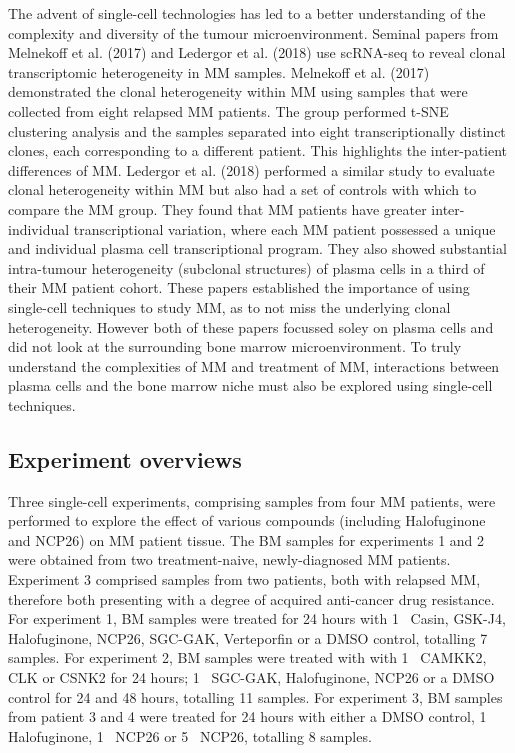 The advent of single-cell technologies has led to a better understanding of the complexity and diversity of the tumour microenvironment.
Seminal papers from Melnekoff et al. (2017)\cite{melnekoff2017single} and Ledergor et al. (2018)\cite{ledergor2018single} use scRNA-seq to reveal clonal transcriptomic heterogeneity in MM samples.
Melnekoff et al. (2017) demonstrated the clonal heterogeneity within MM using samples that were collected from eight relapsed MM patients.
The group performed t-SNE clustering analysis and the samples separated into eight transcriptionally distinct clones, each corresponding to a different patient.
This highlights the inter-patient differences of MM\@.
Ledergor et al. (2018) performed a similar study to evaluate clonal heterogeneity within MM but also had a set of controls with which to compare the MM group.
They found that MM patients have greater inter-individual transcriptional variation, where each MM patient possessed a unique and individual plasma cell transcriptional program.
They also showed substantial intra-tumour heterogeneity (subclonal structures) of plasma cells in a third of their MM patient cohort.
These papers established the importance of using single-cell techniques to study MM, as to not miss the underlying clonal heterogeneity.
However both of these papers focussed soley on plasma cells and did not look at the surrounding bone marrow microenvironment.
To truly understand the complexities of MM and treatment of MM, interactions between plasma cells and the bone marrow niche must also be explored using single-cell techniques.


\subsection{Experiment overviews}
Three single-cell experiments, comprising samples from four MM patients, were performed to explore the effect of various compounds (including Halofuginone and NCP26) on MM patient tissue.
The BM samples for experiments 1 and 2 were obtained from two treatment-naive, newly-diagnosed MM patients.
Experiment 3 comprised samples from two patients, both with relapsed MM, therefore both presenting with a degree of acquired anti-cancer drug resistance.
For experiment 1, BM samples were treated for 24 hours with 1\si{\micro\Molar} Casin, GSK-J4, Halofuginone, NCP26, SGC-GAK, Verteporfin or a DMSO control, totalling 7 samples.
For experiment 2, BM samples were treated with with 1\si{\micro\Molar} CAMKK2, CLK or CSNK2 for 24 hours; 1\si{\micro\Molar} SGC-GAK, Halofuginone, NCP26 or a DMSO control for 24 and 48 hours, totalling 11 samples.
For experiment 3, BM samples from patient 3 and 4 were treated for 24 hours with either a DMSO control, 1\si{\micro\Molar} Halofuginone, 1\si{\micro\Molar} NCP26 or 5\si{\micro\Molar} NCP26, totalling 8 samples.

